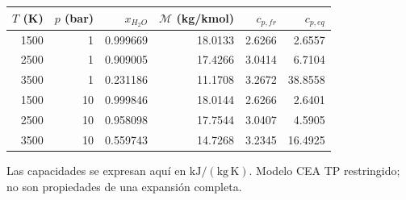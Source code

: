 \begin{center}\small\begin{tabular}{rrrrrr}\toprule $T$ (K)&$p$ (bar)&$x_{H_2O}$&$\mathcal M$ (kg/kmol)&$c_{p,fr}$&$c_{p,eq}$\\\midrule
1500 & 1 & 0.999669 & 18.0133 & 2.6266 & 2.6557\\
2500 & 1 & 0.909005 & 17.4266 & 3.0414 & 6.7104\\
3500 & 1 & 0.231186 & 11.1708 & 3.2672 & 38.8558\\
1500 & 10 & 0.999846 & 18.0144 & 2.6266 & 2.6401\\
2500 & 10 & 0.958098 & 17.7544 & 3.0407 & 4.5905\\
3500 & 10 & 0.559743 & 14.7268 & 3.2345 & 16.4925\\
\bottomrule\end{tabular}\end{center} Las capacidades se expresan aquí en $\mathrm{kJ/(kg\,K)}$. Modelo CEA TP restringido; no son propiedades de una expansión completa.